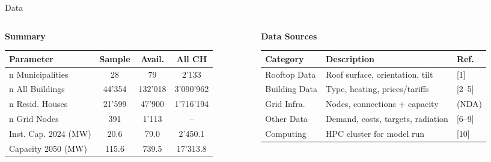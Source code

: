 \documentclass[10pt, aspectratio=169]{beamer}
\begin{document}
\begin{frame}{Data}

\begin{columns}[t]
\begin{column}{0.48\textwidth}

  \centering\textbf{Summary}\\
  \vspace{0.2cm}
  {\scriptsize
  \setlength{\tabcolsep}{3.5pt}
  \renewcommand{\arraystretch}{1.15}
  \begin{tabular}{l c c c}
    \toprule
    \textbf{Parameter} & \textbf{Sample} & \textbf{Avail.} & \textbf{All CH} \\
    \midrule
    n Municipalities         & 28     & 79      & 2'133     \\
    n All Buildings          & 44'354 & 132'018 & 3'090'962 \\
    n Resid. Houses          & 21'599 & 47'900  & 1'716'194 \\
    n Grid Nodes             & 391    & 1'113   & --        \\
    Inst. Cap. 2024 (MW)     & 20.6   & 79.0    & 2'450.1   \\
    Capacity 2050 (MW)       & 115.6  & 739.5   & 17'313.8  \\
    \bottomrule
  \end{tabular}
  }

\end{column}
\begin{column}{0.48\textwidth}

  \centering\textbf{Data Sources}\\
  \vspace{0.2cm}
  {\scriptsize
  \setlength{\tabcolsep}{3.5pt}
  \renewcommand{\arraystretch}{1.15}
  \begin{tabular}{l l l}
    \toprule
    \textbf{Category} & \textbf{Description} & \textbf{Ref.} \\
    \midrule
    Rooftop Data      & Roof surface, orientation, tilt             & [1]     \\
    Building Data     & Type, heating, prices/tariffs               & [2--5]  \\
    Grid Infra.       & Nodes, connections + capacity               & (NDA)   \\
    Other Data        & Demand, costs, targets, radiation           & [6--9]  \\
    Computing         & HPC cluster for model run                   & [10]    \\
    \bottomrule
  \end{tabular}
  \vspace{0.2cm}
  }


\end{column}
\end{columns}
\end{frame}
\end{document}
